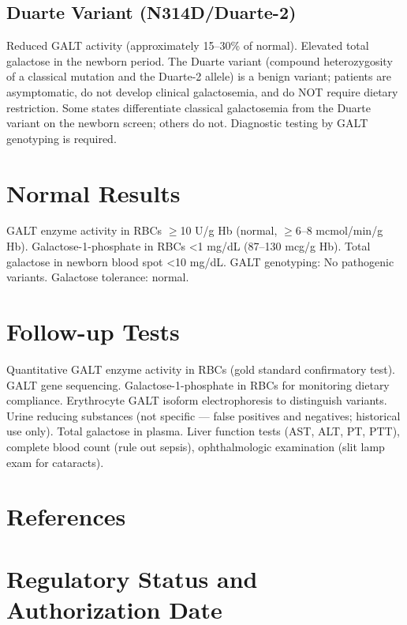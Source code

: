 \subsection*{Duarte Variant (N314D/Duarte-2)}
Reduced GALT activity (approximately 15--30\% of normal). Elevated total galactose in the newborn period. The Duarte variant (compound heterozygosity of a classical mutation and the Duarte-2 allele) is a benign variant; patients are asymptomatic, do not develop clinical galactosemia, and do NOT require dietary restriction. Some states differentiate classical galactosemia from the Duarte variant on the newborn screen; others do not. Diagnostic testing by GALT genotyping is required.

\section*{Normal Results}
GALT enzyme activity in RBCs $\geq$10 U/g Hb (normal, $\geq$6--8 mcmol/min/g Hb). Galactose-1-phosphate in RBCs <1 mg/dL (87--130 mcg/g Hb). Total galactose in newborn blood spot <10 mg/dL. GALT genotyping: No pathogenic variants. Galactose tolerance: normal.

\section*{Follow-up Tests}
Quantitative GALT enzyme activity in RBCs (gold standard confirmatory test). GALT gene sequencing. Galactose-1-phosphate in RBCs for monitoring dietary compliance. Erythrocyte GALT isoform electrophoresis to distinguish variants. Urine reducing substances (not specific --- false positives and negatives; historical use only). Total galactose in plasma. Liver function tests (AST, ALT, PT, PTT), complete blood count (rule out sepsis), ophthalmologic examination (slit lamp exam for cataracts).

\section*{References}



\clearpage
\section*{Regulatory Status and Authorization Date}

\clearpage
